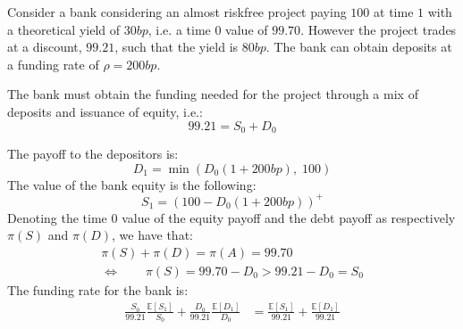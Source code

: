 \documentclass[10pt,a4paper]{article}
\begin{document}
        
        Consider a bank considering an almost riskfree project paying $100$ at time $1$ with a theoretical yield of $30bp$, i.e. a time $0$ value of $99.70$. However the project trades at a discount, $99.21$, such that the yield is $80bp$. The bank can obtain deposits at a funding rate of $\rho = 200bp$. 
        
        The bank must obtain the funding needed for the project through a mix of deposits and issuance of equity, i.e.:
            \begin{equation}
                99.21 = S_{0} + D_{0}
            \end{equation}

        The payoff to the depositors is:
            \begin{equation}
                D_{1} = \min\left(
                    D_{0}(1 + 200bp), \;
                    100
                \right)
            \end{equation}
        The value of the bank equity is the following:
            \begin{equation}
                S_{1} = \left(
                    100 - D_{0}(1 + 200bp)
                \right)^{+}
            \end{equation}
        Denoting the time $0$ value of the equity payoff and the debt payoff as respectively $\pi(S)$ and $\pi(D)$, we have that:
            \begin{gather}
                \pi(S) + \pi(D) = \pi(A) = 99.70 \\
                \Leftrightarrow \qquad \pi(S) = 99.70 - D_{0} > 99.21 - D_{0} = S_{0}
            \end{gather}
        The funding rate for the bank is:
            \begin{align}
                \frac{S_{0}}{99.21} \frac{\mathbb{E}\left[S_{1}\right]}{S_{0}} 
                + \frac{D_{0}}{99.21} \frac{\mathbb{E}\left[D_{1}\right]}{D_{0}} 
                &= \frac{\mathbb{E}\left[S_{1}\right]}{99.21} 
                + \frac{\mathbb{E}\left[D_{1}\right]}{99.21}
            \end{align}
\end{document}
